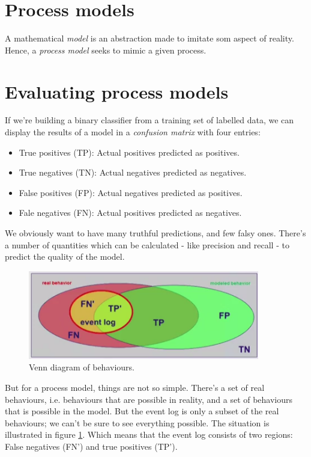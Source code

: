 \documentclass[12pt, a4paper]{article}
\numberwithin{equation}{section}
\begin{document}
\section{Process models}
A mathematical \textit{model} is an abstraction made to imitate som aspect of reality. Hence, a \textit{process model} seeks to mimic a given process.

\section{Evaluating process models}

If we're building a binary classifier from a training set of labelled data, we can display the results of a model in a \textit{confusion matrix} with four entries:
\begin{itemize}
\item True positives (TP): Actual positives predicted as positives.
\item True negatives (TN): Actual negatives predicted as negatives.
\item False positives (FP): Actual negatives predicted as positives.
\item Fale negatives (FN): Actual positives predicted as negatives.
\end{itemize}
We obviously want to have many truthful predictions, and few falsy ones. There's a number of quantities which can be calculated - like precision and recall - to predict the quality of the model.

\begin{figure}
\centering
\includegraphics[width=0.9\textwidth]{process_evaluation}
\caption{Venn diagram of behaviours.}
\label{fig:process_evaluation}
\end{figure}

But for a process model, things are not so simple. There's a set of real behaviours, i.e. behaviours that are possible in reality, and a set of behaviours that is possible in the model. But the event log is only a subset of the real behaviours; we can't be sure to see everything possible. The situation is illustrated in figure \ref{fig:process_evaluation}. Which means that the event log consists of two regions: False negatives (FN') and true positives (TP').
\end{document}

